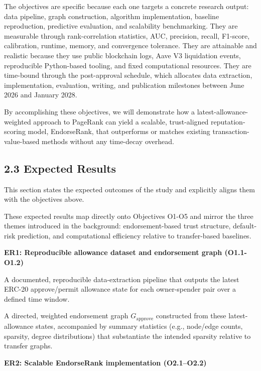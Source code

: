 \documentclass[12pt]{article}
\newcommand{\proposalResultHeading}[1]{%
  \par\addvspace{0.45\baselineskip}%
  \noindent\textbf{#1}\par\nobreak\addvspace{0.06\baselineskip}%
}
\begin{document}
The objectives are specific because each one targets a concrete research output: data pipeline, graph construction, algorithm implementation, baseline reproduction, predictive evaluation, and scalability benchmarking. They are measurable through rank-correlation statistics, AUC, precision, recall, F1-score, calibration, runtime, memory, and convergence tolerance. They are attainable and realistic because they use public blockchain logs, Aave V3 liquidation events, reproducible Python-based tooling, and fixed computational resources. They are time-bound through the post-approval schedule, which allocates data extraction, implementation, evaluation, writing, and publication milestones between June 2026 and January 2028.


By accomplishing these objectives, we will demonstrate how a latest-allowance-weighted approach to PageRank can yield a scalable, trust-aligned reputation-scoring model, EndorseRank, that outperforms or matches existing transaction-value-based methods without any time-decay overhead.


\subsection*{2.3 Expected Results}
\label{sec:expected-results}

This section states the expected outcomes of the study and explicitly aligns them with the objectives above.


These expected results map directly onto Objectives O1-O5 and mirror the three themes introduced in the background: endorsement-based trust structure, default-risk prediction, and computational efficiency relative to transfer-based baselines.


\proposalResultHeading{ER1: Reproducible allowance dataset and endorsement graph (O1.1-O1.2)}

A documented, reproducible data-extraction pipeline that outputs the latest ERC-20 approve/permit allowance state for each owner-spender pair over a defined time window.


A directed, weighted endorsement graph $G_{\text{approve}}$ constructed from these latest-allowance states, accompanied by summary statistics (e.g., node/edge counts, sparsity, degree distributions) that substantiate the intended sparsity relative to transfer graphs.


\proposalResultHeading{ER2: Scalable EndorseRank implementation (O2.1--O2.2)}
\end{document}
